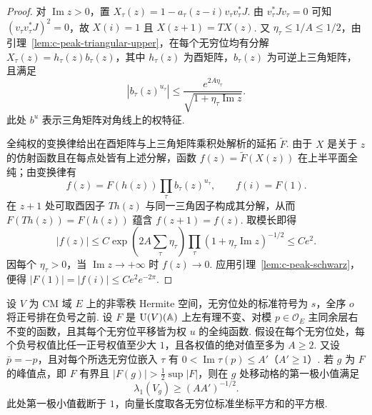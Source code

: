 \begin{proof}
对 $\operatorname{Im}z>0$，置 $X_\tau(z)=1-a_\tau(z-i)v_\tau v_\tau^*J$. 由 $v_\tau^*Jv_\tau=0$ 可知 $(v_\tau v_\tau^*J)^2=0$，故 $X(i)=1$ 且 $X(z+1)=TX(z)$. 又 $\eta_\tau\le1/A\le1/2$，由引理~\ref{lem:c-peak-triangular-upper}，在每个无穷位均有分解 $X_\tau(z)=h_\tau(z)b_\tau(z)$，其中 $h_\tau(z)$ 为酉矩阵，$b_\tau(z)$ 为可逆上三角矩阵，且满足
\[
      |b_\tau(z)^{u_\tau}|
      \le \frac{e^{2A\eta_\tau}}{\sqrt{1+\eta_\tau\operatorname{Im}z}} .
\]
此处 $b^u$ 表示三角矩阵对角线上的权特征.

全纯权的变换律给出在酉矩阵与上三角矩阵乘积处解析的延拓 $\widetilde F$. 由于 $X$ 是关于 $z$ 的仿射函数且在每点处皆有上述分解，函数 $f(z)=\widetilde F(X(z))$ 在上半平面全纯；由变换律有
\[
 f(z)=F(h(z))\prod_\tau b_\tau(z)^{u_\tau},\qquad f(i)=F(1).
\]
在 $z+1$ 处可取酉因子 $Th(z)$ 与同一三角因子构成其分解，从而 $F(Th(z))=F(h(z))$ 蕴含 $f(z+1)=f(z)$. 取模长即得
\[
 |f(z)|\le C\exp\!\left(2A\sum_\tau\eta_\tau\right)
       \prod_\tau(1+\eta_\tau\operatorname{Im}z)^{-1/2}
       \le C e^2.
\]
因每个 $\eta_\tau>0$，当 $\operatorname{Im}z\to+\infty$ 时 $f(z)\to0$. 应用引理~\ref{lem:c-peak-schwarz}，便得 $|F(1)|=|f(i)|\le C e^2 e^{-2\pi}$.
\end{proof}

\begin{lemma}[峰值点处移动格的第一极小值]
\label{lem:c-peak-first-minimum}
\emitthmsource
设 $V$ 为 CM 域 $E$ 上的非零秩 Hermite 空间，无穷位处的标准符号为 $s$，全序 $o$ 将正号排在负号之前. 设 $F$ 是 $\operatorname{U}(V)(\mathbb A)$ 上左有理不变、对模 $p\in\mathcal O_E$ 主同余层右不变的函数，且其每个无穷位平移皆为权 $u$ 的全纯函数. 假设在每个无穷位处，每个负号权值比任一正号权值至少大 $1$，且各权值的绝对值至多为 $A\ge2$. 又设 $\bar p=-p$，且对每个所选无穷位嵌入 $\tau$ 有 $0<\operatorname{Im}\tau(p)\le A'$（$A'\ge1$）. 若 $g$ 为 $F$ 的峰值点，即 $F$ 有界且 $|F(g)|>\tfrac12\sup|F|$，则在 $g$ 处移动格的第一极小值满足
\[
       \lambda_1(V_g)\ge(AA')^{-1/2}.
\]
此处第一极小值截断于 $1$，向量长度取各无穷位标准坐标平方和的平方根.
\end{lemma}

